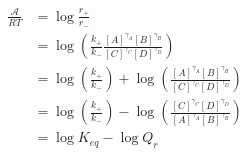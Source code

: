 \begin{eqnarray}\label{eqn:reaction-affinity-mass-action-ratio}
\frac{\mathcal A}{RT} &= \log\frac{r_+}{r_-} \\
& = \log\left(\frac{k_+}{k_-}\frac{[A]^{\gamma_A}[B]^{\gamma_B}}{[C]^{\gamma_C}[D]^{\gamma_D}}\right) \\
& = \log\left(\frac{k_+}{k_-}\right) + \log\left(\frac{[A]^{\gamma_A}[B]^{\gamma_B}}{[C]^{\gamma_C}[D]^{\gamma_D}}\right) \\
& = \log\left(\frac{k_+}{k_-}\right) - \log\left(\frac{[C]^{\gamma_C}[D]^{\gamma_D}}{[A]^{\gamma_A}[B]^{\gamma_B}}\right) \\
& =\log K_{eq} - \log{Q_r} \\
\end{eqnarray}